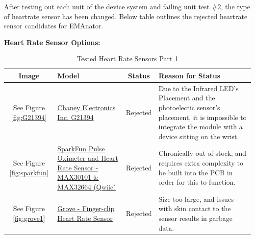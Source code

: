 \documentclass[12pt, titlepage]{article}
\begin{document}
After testing out each unit of the device system and failing unit test \#2, the type of heartrate sensor has been changed. Below table outlines the rejected heartrate sensor candidates for EMAnator.


\textbf{Heart Rate Sensor Options:}\\

\begin{table}[H]

  \label{HRSensors_Pt1}\caption{Tested Heart Rate Sensors Part 1}
  \begin{tabular}{ | c | m{3cm} | c | m{7cm} |}
    \hline
    \textbf{Image}                              & \textbf{Model}                                                                                                                                                    & \textbf{Status} & \textbf{Reason for Status}                                                                                                                                                                                                                                               \\
    \hline
    See Figure \ref{fig:G21394}    & \href{https://secure.sayal.com/STORE2/View_SHOP.php?SKU=247799}{Chaney Electronics Inc. G21394}                                                                   & Rejected        & Due to the Infrared LED's Placement and the photoelectic sensor's placement, it is impossible to integrate the module with a device sitting on the wrist.                                                                                                                \\
    \hline
    See Figure \ref{fig:sparkfun}     & \href{https://www.sparkfun.com/products/15219}{SparkFun Pulse Oximeter and Heart Rate Sensor - MAX30101 \& MAX32664 (Qwiic)}                                      & Rejected        & Chronically out of stock, and requires extra complexity to be built into the PCB in order for this to function.                                                                                                                                                          \\
    \hline
    See Figure \ref{fig:grove1}      & \href{https://www.seeedstudio.com/Grove-Finger-clip-Heart-Rate-Sensor.html?queryID=ad9334e40c7058a87ffd810044eecd1c                                               & objectID=711    & indexName=bazaar_retailer_products}{Grove - Finger-clip Heart Rate Sensor}                                                                                & Rejected & Size too large, and issues with skin contact to the sensor results in garbage data.               \\

\end{tabular}
\end{table}
\end{document}
